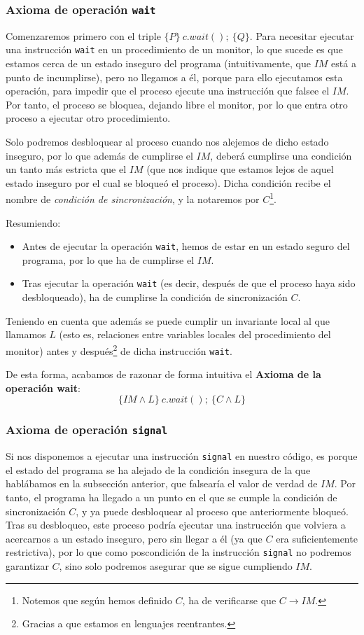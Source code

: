 \subsubsection{Axioma de operación \texttt{wait}}
Comenzaremos primero con el triple $\{P\}\ c.wait();\ \{Q\}$. Para necesitar ejecutar una instrucción \verb|wait| en un procedimiento de un monitor, lo que sucede es que estamos cerca de un estado inseguro del programa (intuitivamente, que $IM$ está a punto de incumplirse), pero no llegamos a él, porque para ello ejecutamos esta operación, para impedir que el proceso ejecute una instrucción que falsee el $IM$. Por tanto, el proceso se bloquea, dejando libre el monitor, por lo que entra otro proceso a ejecutar otro procedimiento. 

Solo podremos desbloquear al proceso cuando nos alejemos de dicho estado inseguro, por lo que además de cumplirse el $IM$, deberá cumplirse una condición un tanto más estricta que el $IM$ (que nos indique que estamos lejos de aquel estado inseguro por el cual se bloqueó el proceso). Dicha condición recibe el nombre de \textit{condición de sincronización}, y la notaremos por $C$\footnote{Notemos que según hemos definido $C$, ha de verificarse que $C\rightarrow IM$.}. 

Resumiendo:
\begin{itemize}
    \item Antes de ejecutar la operación \verb|wait|, hemos de estar en un estado seguro del programa, por lo que ha de cumplirse el $IM$.
    \item Tras ejecutar la operación \verb|wait| (es decir, después de que el proceso haya sido desbloqueado), ha de cumplirse la condición de sincronización $C$.
\end{itemize}
Teniendo en cuenta que además se puede cumplir un invariante local al que llamamos $L$ (esto es, relaciones entre variables locales del procedimiento del monitor) antes y después\footnote{Gracias a que estamos en lenguajes reentrantes.} de dicha instrucción \verb|wait|.

De esta forma, acabamos de razonar de forma intuitiva el \textbf{Axioma de la operación wait}:
\begin{equation*}
    \{IM \land L\}\ c.wait();\ \{C \land L\}
\end{equation*}

\subsubsection{Axioma de operación \texttt{signal}}
Si nos disponemos a ejecutar una instrucción \verb|signal| en nuestro código, es porque el estado del programa se ha alejado de la condición insegura de la que hablábamos en la subsección anterior, que falsearía el valor de verdad de $IM$. Por tanto, el programa ha llegado a un punto en el que se cumple la condición de sincronización $C$, y ya puede desbloquear al proceso que anteriormente bloqueó. Tras su desbloqueo, este proceso podría ejecutar una instrucción que volviera a acercarnos a un estado inseguro, pero sin llegar a él (ya que $C$ era suficientemente restrictiva), por lo que como poscondición de la instrucción \verb|signal| no podremos garantizar $C$, sino solo podremos asegurar que se sigue cumpliendo $IM$.

